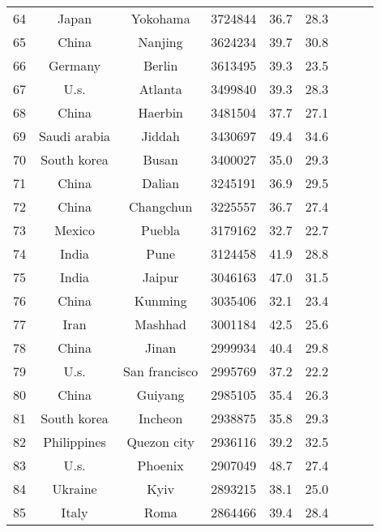 \begin{table}
\begin{tabular}{ccccccccc}
  64 &               Japan &        Yokohama &    3724844 &     36.7 &     28.3 \\
  65 &               China &         Nanjing &    3624234 &     39.7 &     30.8 \\
  66 &             Germany &          Berlin &    3613495 &     39.3 &     23.5 \\
  67 &                U.s. &         Atlanta &    3499840 &     39.3 &     28.3 \\
  68 &               China &         Haerbin &    3481504 &     37.7 &     27.1 \\
  69 &        Saudi arabia &          Jiddah &    3430697 &     49.4 &     34.6 \\
  70 &         South korea &           Busan &    3400027 &     35.0 &     29.3 \\
  71 &               China &          Dalian &    3245191 &     36.9 &     29.5 \\
  72 &               China &       Changchun &    3225557 &     36.7 &     27.4 \\
  73 &              Mexico &          Puebla &    3179162 &     32.7 &     22.7 \\
  74 &               India &            Pune &    3124458 &     41.9 &     28.8 \\
  75 &               India &          Jaipur &    3046163 &     47.0 &     31.5 \\
  76 &               China &         Kunming &    3035406 &     32.1 &     23.4 \\
  77 &                Iran &         Mashhad &    3001184 &     42.5 &     25.6 \\
  78 &               China &           Jinan &    2999934 &     40.4 &     29.8 \\
  79 &                U.s. &   San francisco &    2995769 &     37.2 &     22.2 \\
  80 &               China &         Guiyang &    2985105 &     35.4 &     26.3 \\
  81 &         South korea &         Incheon &    2938875 &     35.8 &     29.3 \\
  82 &         Philippines &     Quezon city &    2936116 &     39.2 &     32.5 \\
  83 &                U.s. &         Phoenix &    2907049 &     48.7 &     27.4 \\
  84 &             Ukraine &            Kyiv &    2893215 &     38.1 &     25.0 \\
  85 &               Italy &            Roma &    2864466 &     39.4 &     28.4 \\

\end{tabular}
\end{table}
